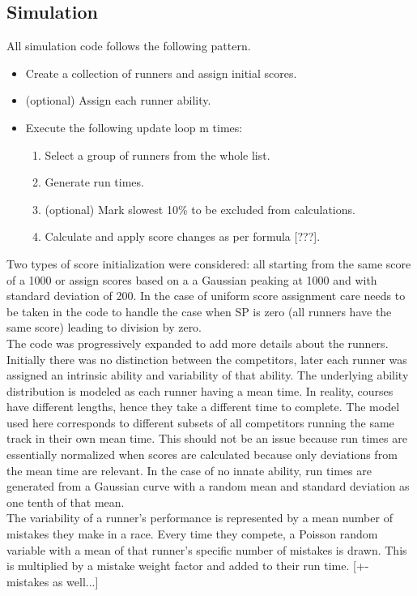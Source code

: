\subsection{Simulation}
All simulation code follows the following pattern.
\begin{itemize}
\item Create a collection of runners and assign initial scores.
\item (optional) Assign each runner ability.
\item Execute the following update loop m times:
	\begin{enumerate}
	\item Select a group of runners from the whole list.
	\item Generate run times.
	\item (optional) Mark slowest 10\% to be excluded from calculations.
	\item Calculate and apply score changes as per formula [???].
	\end{enumerate}
\end{itemize}

Two types of score initialization were considered: all starting from the same score of a 1000 or assign scores based on a a Gaussian peaking at 1000 and with standard deviation of 200. In the case of uniform score assignment care needs to be taken in the code to handle the case when SP is zero (all runners have the same score) leading to division by zero.\\
The code was progressively expanded to add more details about the runners. Initially there was no distinction between the competitors, later each runner was assigned an intrinsic ability and variability of that ability. The underlying ability distribution is modeled as each runner having a mean time. In reality, courses have different lengths, hence they take a different time to complete. The model used here corresponds to different subsets of all competitors running the same track in their own mean time. This should not be an issue because run times are essentially normalized when scores are calculated because only deviations from the mean time are relevant.
In the case of no innate ability, run times are generated from a Gaussian curve with a random mean and standard deviation as one tenth of that mean.\\ 
The variability of a runner's performance is represented by a mean number of mistakes they make in a race. Every time they compete, a Poisson random variable with a mean of that runner's specific number of mistakes is drawn. This is multiplied by a mistake weight factor and added to their run time. [+- mistakes as well...]

